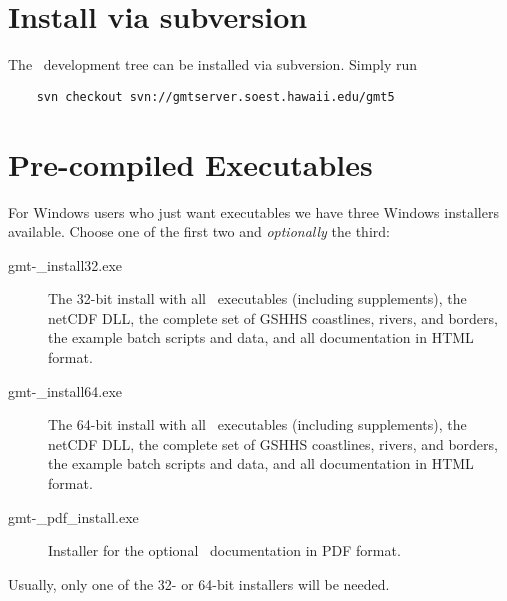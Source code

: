 \section{Install via subversion}

The \GMT\ development tree can be installed via subversion.  Simply run
\begin{verbatim}
	svn checkout svn://gmtserver.soest.hawaii.edu/gmt5
\end{verbatim}

\section{Pre-compiled Executables}

For Windows users who just want executables we have three Windows installers available.  Choose one
of the first two and \emph{optionally} the third:

\begin{description}

\item[gmt-\GMTDOCVERSION\_install32.exe] The 32-bit install with all \GMT\ executables (including supplements),
the netCDF DLL, the complete set of GSHHS coastlines, rivers, and borders, the example batch scripts and data, and all documentation in HTML format.

\item[gmt-\GMTDOCVERSION\_install64.exe] The 64-bit install with all \GMT\ executables (including supplements),
the netCDF DLL, the complete set of GSHHS coastlines, rivers, and borders, the example batch scripts and data, and all documentation in HTML format.

\item[gmt-\GMTDOCVERSION\_pdf\_install.exe] Installer for the optional \GMT\ documentation in PDF format.

\end{description}
Usually, only one of the 32- or 64-bit installers will be needed.

